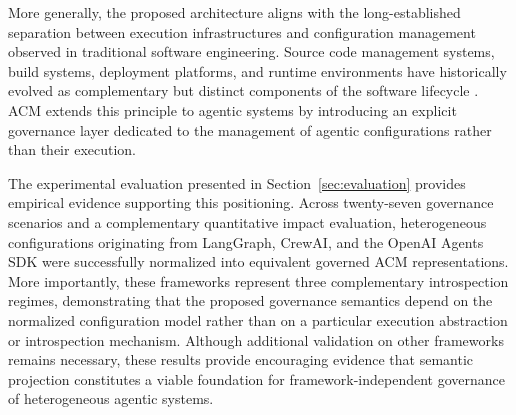 \documentclass[10pt]{article}
\begin{document}
More generally, the proposed architecture aligns with the long-established separation between execution infrastructures and configuration management observed in traditional software engineering. Source code management systems, build systems, deployment platforms, and runtime environments have historically evolved as complementary but distinct components of the software lifecycle \cite{ref25}. ACM extends this principle to agentic systems by introducing an explicit governance layer dedicated to the management of agentic configurations rather than their execution.

The experimental evaluation presented in Section~\ref{sec:evaluation} provides empirical evidence supporting this positioning. Across twenty-seven governance scenarios and a complementary quantitative impact evaluation, heterogeneous configurations originating from LangGraph, CrewAI, and the OpenAI Agents SDK were successfully normalized into equivalent governed ACM representations. More importantly, these frameworks represent three complementary introspection regimes, demonstrating that the proposed governance semantics depend on the normalized configuration model rather than on a particular execution abstraction or introspection mechanism. Although additional validation on other frameworks remains necessary, these results provide encouraging evidence that semantic projection constitutes a viable foundation for framework-independent governance of heterogeneous agentic systems.
\end{document}
